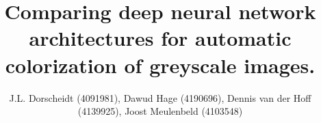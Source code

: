 \documentclass[journal,onecolumn]{IEEEtran}
\begin{document}
\title{\LARGE Comparing deep neural network architectures for automatic colorization of greyscale images.}

\author{J.L. Dorscheidt (4091981), Dawud Hage (4190696), Dennis van der Hoff (4139925), Joost Meulenbeld (4103548)}%
\maketitle

%
\begin{abstract}

\end{abstract}


\IEEEpeerreviewmaketitle










\FloatBarrier




\newpage
\appendices




 
\end{document}

